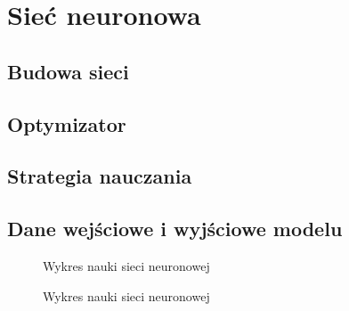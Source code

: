 \section{Sieć neuronowa}
\subsection{Budowa sieci}
\subsection{Optymizator}
\subsection{Strategia nauczania}
\subsection{Dane wejściowe i wyjściowe modelu}

\begin{figure}[h]
    \centering
    \caption{Wykres nauki sieci neuronowej}
    \label{img:gameai_diagram}
\end{figure}

\begin{figure}[h]
    \centering
    \caption{Wykres nauki sieci neuronowej}
    \label{img:gameai_diagram}
\end{figure}
